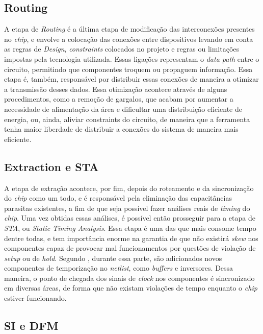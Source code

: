 \documentclass[
	12pt,				%
    oneside,			%
	a4paper,			%
	english,			%
	french,				%
	spanish,			%
	brazil				%
	]{abntex2}
\begin{document}
\subsection{Routing}

A etapa de \textit{Routing} é a última etapa de modificação das interconexões presentes no \textit{chip}, e envolve a colocação das conexões entre dispositivos levando em conta as regras de \textit{Design}, \textit{constraints} colocados no projeto e regras ou limitações impostas pela tecnologia utilizada. Essas ligações representam o \textit{data path} entre o circuito, permitindo que componentes troquem ou propaguem informação. Essa etapa é, também, responsável por distribuir essas conexões de maneira a otimizar a transmissão desses dados. Essa otimização acontece através de alguns procedimentos, como a remoção de gargalos, que acabam por aumentar a necessidade de alimentação da área e dificultar uma distribuição eficiente de energia, ou, ainda, aliviar constraints do circuito, de maneira que a ferramenta tenha maior liberdade de distribuir a conexões do sistema de maneira mais eficiente.

\subsection{Extraction e STA}

A etapa de extração acontece, por fim, depois do roteamento e da sincronização do \textit{chip} como um todo, e é responsável pela eliminação das capacitâncias parasitas existentes, a fim de que seja possível fazer análises reais de \textit{timing} do \textit{chip}. Uma vez obtidas essas análises, é possível então prosseguir para a etapa de \textit{STA}, ou \textit{Static Timing Analysis}. Essa etapa é uma das que mais consome tempo dentre todas, e tem importância enorme na garantia de que não existirá \textit{skew} nos componentes capaz de provocar mal funcionamentos por questões de violação de \textit{setup} ou de \textit{hold}. Segundo \citeauthor{Bhasker}, durante essa parte, são adicionados novos componentes de temporização no \textit{netlist}, como \textit{buffers} e inversores. Dessa maneira, o ponto de chegada dos sinais de \textit{clock} nos componentes é sincronizado em diversas áreas, de forma que não existam violações de tempo enquanto o \textit{chip} estiver funcionando.

\subsection{SI e DFM}
\end{document}
